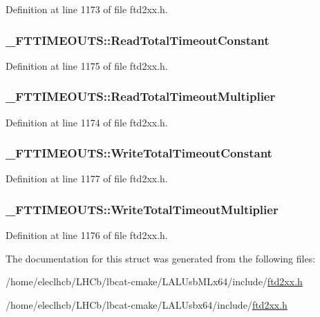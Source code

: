 Definition at line 1173 of file ftd2xx.h.\hypertarget{struct__FTTIMEOUTS_aa6478849c632565b01f91faca975cabe}{
\subsubsection[{ReadTotalTimeoutConstant}]{ {\bf \_\-FTTIMEOUTS::ReadTotalTimeoutConstant}}}
\label{struct__FTTIMEOUTS_aa6478849c632565b01f91faca975cabe}


Definition at line 1175 of file ftd2xx.h.\hypertarget{struct__FTTIMEOUTS_abec01499b73ce0bd194ca0628dbf58e8}{
\subsubsection[{ReadTotalTimeoutMultiplier}]{ {\bf \_\-FTTIMEOUTS::ReadTotalTimeoutMultiplier}}}
\label{struct__FTTIMEOUTS_abec01499b73ce0bd194ca0628dbf58e8}


Definition at line 1174 of file ftd2xx.h.\hypertarget{struct__FTTIMEOUTS_ac36dfafaf9522e0b041080242538d196}{
\subsubsection[{WriteTotalTimeoutConstant}]{ {\bf \_\-FTTIMEOUTS::WriteTotalTimeoutConstant}}}
\label{struct__FTTIMEOUTS_ac36dfafaf9522e0b041080242538d196}


Definition at line 1177 of file ftd2xx.h.\hypertarget{struct__FTTIMEOUTS_a1944986d4b6760a45db8ce1b58fa3688}{
\subsubsection[{WriteTotalTimeoutMultiplier}]{ {\bf \_\-FTTIMEOUTS::WriteTotalTimeoutMultiplier}}}
\label{struct__FTTIMEOUTS_a1944986d4b6760a45db8ce1b58fa3688}


Definition at line 1176 of file ftd2xx.h.

The documentation for this struct was generated from the following files:\begin{DoxyCompactItemize}
\item 
/home/eleclhcb/LHCb/lbcat-\/cmake/LALUsbMLx64/include/\hyperlink{LALUsbMLx64_2include_2ftd2xx_8h}{ftd2xx.h}\item 
/home/eleclhcb/LHCb/lbcat-\/cmake/LALUsbx64/include/\hyperlink{LALUsbx64_2include_2ftd2xx_8h}{ftd2xx.h}\end{DoxyCompactItemize}
